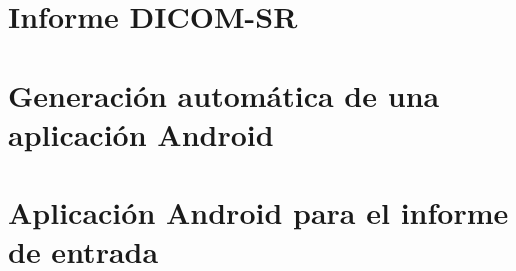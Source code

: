 \section{Informe DICOM-SR}
\section{Generación automática de una aplicación Android}
\section{Aplicación Android para el informe de entrada}\label{sec:appfinal}